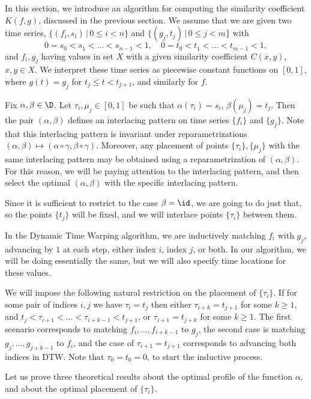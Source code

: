\documentclass[12pt]{amsart}
\begin{document}
In this section, we introduce an algorithm for computing the similarity coefficient $K(f,g)$, discussed in the previous section.  We assume that we are given two time series, $\{ (f_i, s_i) \,|\, 0\leq i < n \}$ and 
$\{ (g_j, t_j) \,|\, 0\leq j < m\}$ with \[0 = s_0 < s_1 < \ldots < s_{n-1} < 1, \quad  0 = t_0 < t_1 < \ldots < t_{m-1} < 1,\]
and $f_i, g_j$ having values in set $X$ with a given similarity coefficient $C(x,y)$, $x,y \in X$.
We interpret these time series as piecewise constant functions on $[0,1]$, where $g(t) = g_j$ for $t_j \leq t < t_{j+1}$, and similarly for $f$. 

Fix $\alpha, \beta \in \D$. Let $\tau_i, \mu_j \in [0,1]$ be such that $\alpha(\tau_i) = s_i$, $\beta(\mu_j) = t_j$. Then the pair $(\alpha, \beta)$ defines an interlacing pattern on time series $\{ f_i \}$ and $\{ g_j \}$. Note that this interlacing pattern is invariant under reparametrizations  $(\alpha, \beta) \mapsto 
(\alpha \circ \gamma, \beta \circ \gamma)$. Moreover, any placement of points $\{ \tau_i \}, \{ \mu_j \}$ with the same interlacing pattern may be obtained using a reparametrization of $(\alpha, \beta)$. For this reason, we will be paying attention to the interlacing pattern, and then select the optimal $(\alpha, \beta)$ with the specific interlacing pattern.

Since it is sufficient to restrict to the case $\beta = \id$, we are going to do just that, so the points $\{ t_j \}$ will be fixed, and we will interlace points $\{ \tau_i \}$ between them.

In the Dynamic Time Warping algorithm, we are inductively matching $f_i$ with $g_j$, advancing by $1$ at each step, either index $i$, index $j$, or both. In our algorithm, we will be doing essentially the same, but we will also specify time locations for these values. 

We will impose the following natural restriction on the placement of $\{ \tau_i \}$. If for some pair of indices $i, j$ we have $\tau_i = t_j$ then either $\tau_{i+k} = t_{j+1}$ for some $k \geq 1$, and 
$t_j < \tau_{i+1} < \ldots < \tau_{i+k-1} < t_{j+1}$,  or $\tau_{i+1} = t_{j+k}$ for some $k \geq 1$.
The first scenario corresponds to matching $f_i, \ldots, f_{i+k-1}$ to $g_j$, the second case is matching 
$g_j, \ldots, g_{j+k-1}$ to $f_i$, and the case of $\tau_{i+1} = t_{j+1}$ corresponds to advancing both indices in DTW. Note that $\tau_0 = t_0 = 0$, to start the inductive process.

Let us prove three theoretical results about the optimal profile of the function $\alpha$, and about the optimal placement of $\{ \tau_i \}$.
\end{document}
